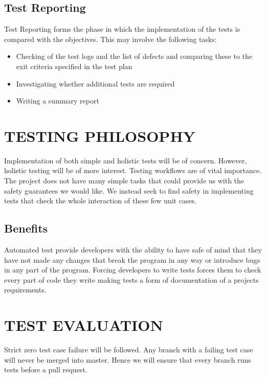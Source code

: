 \documentclass[12pt]{article}
\begin{document}
\subsection{Test Reporting}
Test Reporting forms the phase in which the implementation of the tests is compared with the objectives. This may involve the following tasks: \newline
\begin{itemize}
 \item Checking of the test logs and the list of defects and comparing these to the exit criteria specified in the test plan   
\item Investigating whether additional tests are required
\item Writing a summary report 
\end{itemize}
  \section{TESTING PHILOSOPHY}
  Implementation of both simple and holistic tests will be of concern. However, holistic testing will be of more interest. Testing workflows are of vital importance. The project does not have many simple tasks that could provide us with the safety guarantees we would like. We instead seek to find safety in implementing tests that check the whole interaction of these few unit cases.
  
  \subsection{Benefits}
  Automated test provide developers with the ability to have safe of mind that they have not made any changes that break the program in any way or introduce bugs in any part of the program.
  Forcing developers to write tests forces them to check every part of code they write making tests a form of documentation of a projects requirements.
  
  \section{TEST EVALUATION}
  Strict zero test case failure will be followed. Any branch with a failing test case will never be merged into master. Hence we will ensure that every branch runs tests before a pull request.
  
\end{document}
